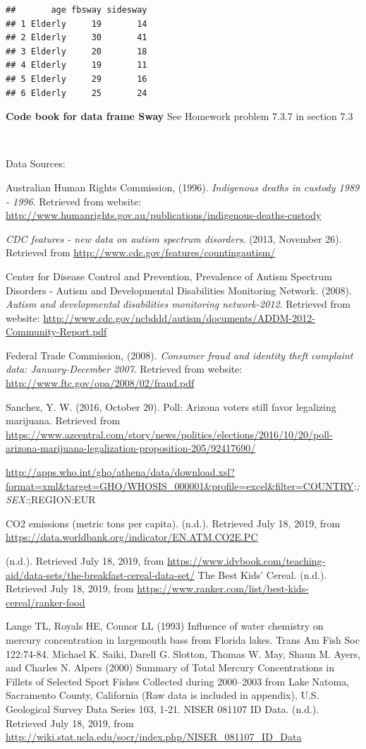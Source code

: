 \documentclass[]{book}
\begin{document}
\begin{verbatim}
##       age fbsway sidesway
## 1 Elderly     19       14
## 2 Elderly     30       41
## 3 Elderly     20       18
## 4 Elderly     19       11
## 5 Elderly     29       16
## 6 Elderly     25       24
\end{verbatim}

\textbf{Code book for data frame Sway} See Homework problem 7.3.7 in section 7.3

\textbf{\\
}

Data Sources:

Australian Human Rights Commission, (1996). \emph{Indigenous deaths in
custody 1989 - 1996}. Retrieved from website:
\url{http://www.humanrights.gov.au/publications/indigenous-deaths-custody}

\emph{CDC features - new data on autism spectrum disorders}. (2013, November
26). Retrieved from \url{http://www.cdc.gov/features/countingautism/}

Center for Disease Control and Prevention, Prevalence of Autism Spectrum
Disorders - Autism and Developmental Disabilities Monitoring Network.
(2008). \emph{Autism and developmental disabilities monitoring network-2012}.
Retrieved from website:
\url{http://www.cdc.gov/ncbddd/autism/documents/ADDM-2012-Community-Report.pdf}

Federal Trade Commission, (2008). \emph{Consumer fraud and identity theft
complaint data: January-December 2007}. Retrieved from website:
\url{http://www.ftc.gov/opa/2008/02/fraud.pdf}

Sanchez, Y. W. (2016, October 20). Poll: Arizona voters still favor legalizing marijuana. Retrieved from \url{https://www.azcentral.com/story/news/politics/elections/2016/10/20/poll-arizona-marijuana-legalization-proposition-205/92417690/}

\url{http://apps.who.int/gho/athena/data/download.xsl?format=xml\&target=GHO/WHOSIS_000001\&profile=excel\&filter=COUNTRY}:\emph{;SEX:};REGION:EUR

CO2 emissions (metric tons per capita). (n.d.). Retrieved July 18, 2019, from \url{https://data.worldbank.org/indicator/EN.ATM.CO2E.PC}

(n.d.). Retrieved July 18, 2019, from \url{https://www.idvbook.com/teaching-aid/data-sets/the-breakfast-cereal-data-set/}
The Best Kids' Cereal. (n.d.). Retrieved July 18, 2019, from \url{https://www.ranker.com/list/best-kids-cereal/ranker-food}

Lange TL, Royals HE, Connor LL (1993) Influence of water chemistry on mercury concentration in largemouth bass from Florida lakes. Trans Am Fish Soc 122:74-84.
Michael K. Saiki, Darell G. Slotton, Thomas W. May, Shaun M. Ayers, and Charles N. Alpers (2000) Summary of Total Mercury Concentrations in Fillets of Selected Sport Fishes Collected during 2000--2003 from Lake Natoma, Sacramento County, California (Raw data is included in appendix), U.S. Geological Survey Data Series 103, 1-21.
NISER 081107 ID Data. (n.d.). Retrieved July 18, 2019, from \url{http://wiki.stat.ucla.edu/socr/index.php/NISER_081107_ID_Data}
\end{document}
